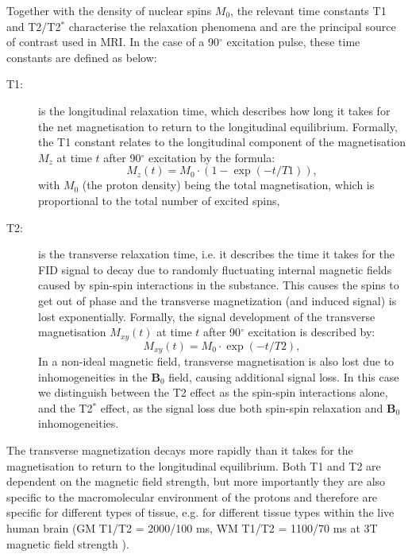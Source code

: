 Together with the density of nuclear spins $M_0$, the relevant time constants T1 and T2/T2$^*$ characterise the relaxation phenomena and are the principal source of contrast used in \gls{MRI}. In the case of a 90$^\circ$ excitation pulse, these time constants are defined as below:
\begin{description}
	\item[T1:] is the longitudinal relaxation time, which describes how long it takes for the net magnetisation to return to the longitudinal equilibrium. Formally, the T1 constant relates to the longitudinal component of the magnetisation $M_z$ at time $t$ after 90$^\circ$ excitation by the formula:
	\begin{equation}
		M_z(t) = M_0 \cdot (1-\exp(-t/T1)),
	\end{equation} 
	with $M_0$ (the proton density) being the total magnetisation, which is proportional to the total number of excited spins, 
	\item[T2:] is the transverse relaxation time, i.e. it describes the time it takes for the FID signal to decay due to randomly fluctuating internal magnetic fields caused by spin-spin interactions in the substance. This causes the spins to get out of phase and the transverse magnetization (and induced signal) is lost exponentially. Formally, the signal development of the transverse magnetisation $M_{xy}(t)$ at time $t$ after 90$^\circ$ excitation is described by:
	\begin{equation}
		M_{xy}(t) = M_0 \cdot \exp(-t/T2),
	\end{equation} 	
	In a non-ideal magnetic field, transverse magnetisation is also lost due to inhomogeneities in the $\mathbf{B}_0$ field, causing additional signal loss. In this case we distinguish between the T2 effect as the spin-spin interactions alone, and the T2$^*$ effect, as the signal loss due both spin-spin relaxation and $\mathbf{B}_0$ inhomogeneities.
\end{description}

The transverse magnetization decays more rapidly than it takes for the magnetisation to return to the longitudinal equilibrium. Both T1 and T2 are dependent on the magnetic field strength, but more importantly they are also specific to the macromolecular environment of the protons and therefore are specific for different types of tissue, e.g. for different tissue types within the live human brain (\gls{GM} T1/T2 = 2000/100 ms, \gls{WM} T1/T2 = 1100/70 ms at 3T magnetic field strength \citep{Stanisz:2005}).
